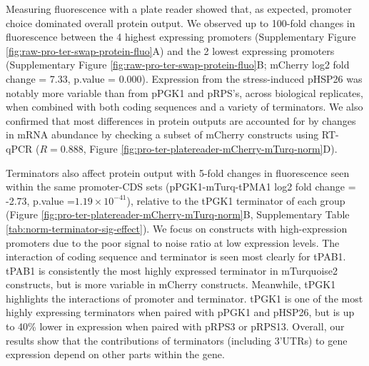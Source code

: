 \documentclass{SBCbookchapter}
\begin{document}
Measuring fluorescence with a plate reader showed that, as expected, promoter choice dominated overall protein output.
We observed up to 100-fold changes in fluorescence between the 4 highest expressing promoters (Supplementary Figure \ref{fig:raw-pro-ter-swap-protein-fluo}A) and the 2 lowest expressing promoters (Supplementary Figure \ref{fig:raw-pro-ter-swap-protein-fluo}B; mCherry log2 fold change = 7.33, p.value = 0.000).
Expression from the stress-induced pHSP26 was notably more variable than from pPGK1 and pRPS's, across biological replicates, when combined with both coding sequences and a variety of terminators.
We also confirmed that most differences in protein outputs are accounted for by changes in mRNA abundance by checking a subset of mCherry constructs using RT-qPCR (\(R = 0.888\), Figure \ref{fig:pro-ter-platereader-mCherry-mTurq-norm}D).

Terminators also affect protein output with 5-fold changes in fluorescence seen within the same promoter-CDS sets (pPGK1-mTurq-tPMA1 log2 fold change = -2.73, p.value =\(1.19 \times 10^{-41}\)), relative to the tPGK1 terminator of each group (Figure \ref{fig:pro-ter-platereader-mCherry-mTurq-norm}B, Supplementary Table \ref{tab:norm-terminator-sig-effect}).
We focus on constructs with high-expression promoters due to the poor signal to noise ratio at low expression levels.
The interaction of coding sequence and terminator is seen most clearly for tPAB1.
tPAB1 is consistently the most highly expressed terminator in mTurquoise2 constructs, but is more variable in mCherry constructs.
Meanwhile, tPGK1 highlights the interactions of promoter and terminator.
tPGK1 is one of the most highly expressing terminators when paired with pPGK1 and pHSP26, but is up to 40\% lower in expression when paired with pRPS3 or pRPS13.
Overall, our results show that the contributions of terminators (including 3'UTRs) to gene expression depend on other parts within the gene.
\end{document}
